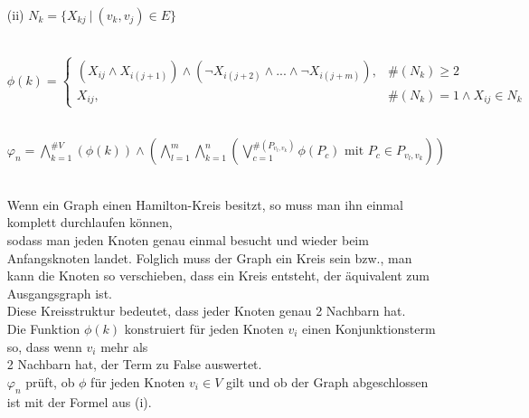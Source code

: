 \documentclass[a4paper,10pt]{article}
\begin{document}
\begin{enumerate}
	\item[(ii)]
	\( N_k = \{X_{kj}~|~(v_k,v_j) \in E\} \)
	
	\ \\ \( \phi(k) = \begin{cases}	
	(X_{ij} \wedge X_{i(j+1)}) \wedge (\neg X_{i(j+2)} \wedge ... \wedge \neg X_{i(j+m)}), & \#(N_k) \geq 2\\
	X_{ij}, & \#(N_k) = 1 \wedge X_{ij} \in N_k 	
	\end{cases} \)
	
	\ \\ \( \varphi_n = \bigwedge\limits_{k = 1}^{\#V} (\phi(k)) 
	\wedge \left( \bigwedge\limits_{l = 1}^{m} \bigwedge\limits_{k = 1}^{n} 
	(\bigvee\limits_{c = 1}^{\#(P_{v_l,v_k})} \phi(P_c) \text{ mit }P_c \in P_{v_l,v_k})\right)  \)
	
	\ \\Wenn ein Graph einen Hamilton-Kreis besitzt, so muss man ihn einmal komplett durchlaufen können, \\
	sodass man jeden Knoten genau einmal besucht und wieder beim Anfangsknoten landet. Folglich muss der Graph ein 	       	Kreis sein bzw., man kann die Knoten so verschieben, dass ein Kreis entsteht, 
	der äquivalent zum Ausgangsgraph ist. \\
	Diese Kreisstruktur bedeutet, dass jeder Knoten genau 2 Nachbarn hat. \\
	Die Funktion $\phi(k)$ konstruiert für jeden Knoten $v_i$ einen Konjunktionsterm so, dass wenn $v_i$  mehr als \\
	2 Nachbarn hat, der Term zu False auswertet.\\
	$\varphi_n$ prüft, ob $\phi$ für jeden Knoten $v_i \in V$ gilt und ob der Graph abgeschlossen \\
	ist mit der Formel aus (i).

	\end{enumerate}
	
\end{document}
